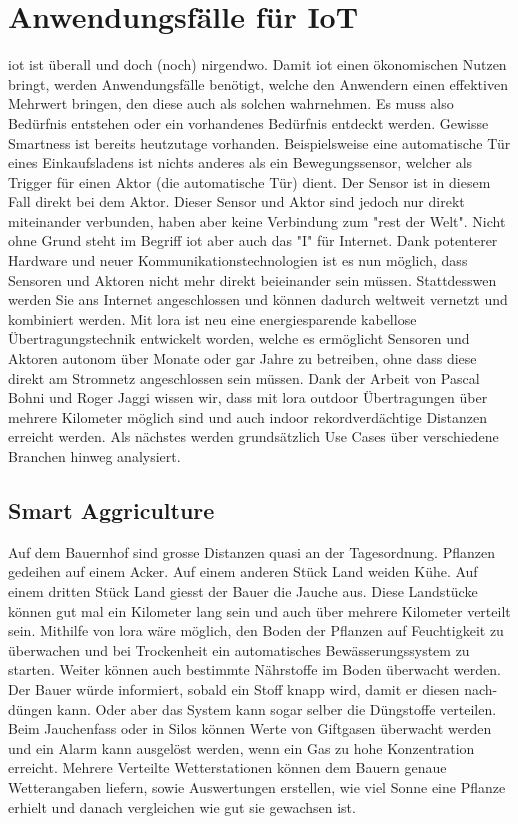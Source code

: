 \chapter{Anwendungsfälle für IoT}

\gls{iot} ist überall und doch (noch) nirgendwo. Damit \gls{iot} einen ökonomischen Nutzen bringt, werden Anwendungsfälle benötigt, welche den Anwendern einen effektiven Mehrwert bringen, den diese auch als solchen wahrnehmen. Es muss also Bedürfnis entstehen oder ein vorhandenes Bedürfnis entdeckt werden. Gewisse \glqq{}Smartness\grqq{} ist bereits heutzutage vorhanden. Beispielsweise eine automatische Tür eines Einkaufsladens ist nichts anderes als ein Bewegungssensor, welcher als Trigger für einen Aktor (die automatische Tür) dient. Der Sensor ist in diesem Fall direkt bei dem Aktor. Dieser Sensor und Aktor sind jedoch nur direkt miteinander verbunden, haben aber keine Verbindung zum "rest der Welt".
Nicht ohne Grund steht im Begriff \gls{iot} aber auch das "I" für Internet. Dank potenterer Hardware und neuer Kommunikationstechnologien ist es nun möglich, dass Sensoren und Aktoren nicht mehr direkt beieinander sein müssen. Stattdesswen werden Sie ans Internet angeschlossen und können dadurch weltweit vernetzt und kombiniert werden. Mit \gls{lora} ist neu eine energiesparende kabellose Übertragungstechnik entwickelt worden, welche es ermöglicht Sensoren und Aktoren autonom über Monate oder gar Jahre zu betreiben, ohne dass diese direkt am Stromnetz angeschlossen sein müssen. Dank der Arbeit von Pascal Bohni und Roger Jaggi \autocite[29]{bfh:optimizedDataTransmission} wissen wir, dass mit \gls{lora} outdoor Übertragungen über mehrere Kilometer möglich sind und auch indoor rekordverdächtige Distanzen erreicht werden. Als nächstes werden grundsätzlich Use Cases über verschiedene Branchen hinweg analysiert.


\section{Smart Aggriculture}
Auf dem Bauernhof sind grosse Distanzen quasi an der Tagesordnung. Pflanzen gedeihen auf einem Acker. Auf einem anderen Stück Land weiden Kühe. Auf einem dritten Stück Land giesst der Bauer die Jauche aus. Diese Landstücke können gut mal ein Kilometer lang sein und auch über mehrere Kilometer verteilt sein. Mithilfe von \gls{lora} wäre möglich, den Boden der Pflanzen auf Feuchtigkeit zu überwachen und bei Trockenheit ein automatisches Bewässerungssystem zu starten. Weiter können auch bestimmte Nährstoffe im Boden überwacht werden. Der Bauer würde informiert, sobald ein Stoff knapp wird, damit er diesen nach-düngen kann. Oder aber das System kann sogar selber die Düngstoffe verteilen. Beim Jauchenfass oder in Silos können Werte von Giftgasen überwacht werden und ein Alarm kann ausgelöst werden, wenn ein Gas zu hohe Konzentration erreicht. Mehrere Verteilte Wetterstationen können dem Bauern genaue Wetterangaben liefern, sowie Auswertungen erstellen, wie viel Sonne eine Pflanze erhielt und danach vergleichen wie gut sie gewachsen ist.


